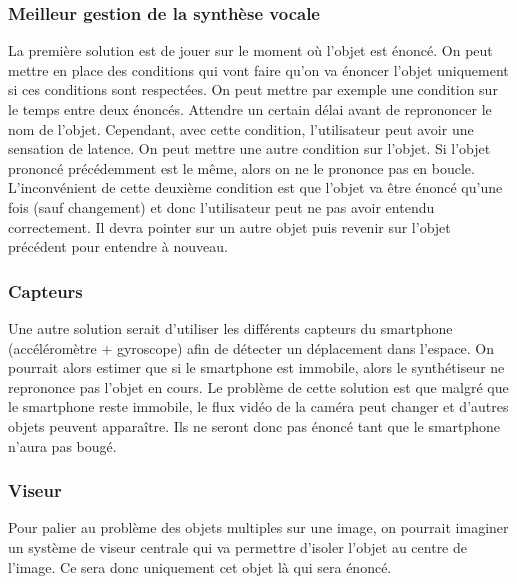 \documentclass[UTF8]{EPURapport}
\begin{document}
\subsubsection{Meilleur gestion de la synthèse vocale}
La première solution est de jouer sur le moment où l'objet est énoncé. On peut mettre en place des conditions qui vont faire qu'on va énoncer l'objet uniquement si ces conditions sont respectées. On peut mettre par exemple une condition sur le temps entre deux énoncés. Attendre un certain délai avant de reprononcer le nom de l'objet. Cependant, avec cette condition, l'utilisateur peut avoir une sensation de latence. On peut mettre une autre condition sur l'objet. Si l'objet prononcé précédemment est le même, alors on ne le prononce pas en boucle. L'inconvénient de cette deuxième condition est que l'objet va être énoncé qu'une fois (sauf changement) et donc l'utilisateur peut ne pas avoir entendu correctement. Il devra pointer sur un autre objet puis revenir sur l'objet précédent pour entendre à nouveau. 
\subsubsection{Capteurs}
Une autre solution serait d'utiliser les différents capteurs du smartphone (accéléromètre + gyroscope) afin de détecter un déplacement dans l'espace. On pourrait alors estimer que si le smartphone est immobile, alors le synthétiseur ne reprononce pas l'objet en cours. Le problème de cette solution est que malgré que le smartphone reste immobile, le flux vidéo de la caméra peut changer et d'autres objets peuvent apparaître. Ils ne seront donc pas énoncé tant que le smartphone n'aura pas bougé.
\subsubsection{Viseur}
Pour palier au problème des objets multiples sur une image, on pourrait imaginer un système de viseur centrale qui va permettre d'isoler l'objet au centre de l'image. Ce sera donc uniquement cet objet là qui sera énoncé.
\end{document}

